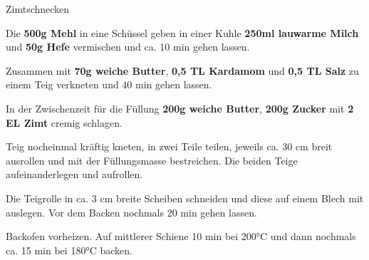 \begin{recipe}[]{Zimtschnecken} %
	

\step
Die \textbf{500g Mehl} in eine Schüssel geben in einer Kuhle \textbf{250ml lauwarme Milch} und \textbf{50g Hefe} vermischen und ca. 10 min gehen lassen. 

\step
Zusammen mit \textbf{70g weiche Butter}, \textbf{0,5 TL Kardamom} und \textbf{0,5 TL Salz} zu einem Teig verkneten und 40 min gehen lassen.

\step
In der Zwischenzeit für die Füllung \textbf{200g weiche Butter}, \textbf{200g Zucker} mit \textbf{2 EL Zimt} cremig schlagen.

\step
Teig nocheinmal kräftig kneten, in zwei Teile teilen, jeweils ca. 30 cm breit ausrollen und mit der Füllungsmasse bestreichen. Die beiden Teige aufeinanderlegen und aufrollen.

\step
Die Teigrolle in ca. 3 cm breite Scheiben schneiden und diese auf einem Blech mit auslegen. Vor dem Backen nochmals 20 min gehen lassen. 

\step
Backofen vorheizen. Auf mittlerer Schiene 10 min bei 200°C und dann nochmals ca. 15 min bei 180°C backen. 



\end{recipe}

